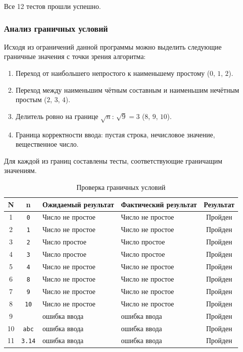 \documentclass{article}[14pt]
\begin{document}
Все 12 тестов прошли успешно.

\subsubsection{Анализ граничных условий}

Исходя из ограничений данной программы можно выделить следующие граничные значения с точки зрения алгоритма:

\begin{enumerate}
    \item Переход от наибольшего непростого к наименьшему простому ($0$, $1$, $2$).
    \item Переход между наименьшим чётным составным и наименьшим нечётным простым ($2$, $3$, $4$).
    \item Делитель ровно на границе $\sqrt{n}$: $\sqrt{9} = 3$ ($8$, $9$, $10$).
    \item Граница корректности ввода: пустая строка, нечисловое значение, вещественное число.
\end{enumerate}

Для каждой из границ составлены тесты, соответствующие граничащим значениям.

\begin{table}[H]
\centering
\caption{Проверка граничных условий}
\begin{tabular}{|c|c|p{3.5cm}|p{3.5cm}|c|}
\hline
\textbf{N} & \textbf{n} & \textbf{Ожидаемый результат} & \textbf{Фактический результат} & \textbf{Результат} \\
\hline
1 & \texttt{0}   & Число не простое & Число не простое & Пройден \\
\hline
2 & \texttt{1}   & Число не простое & Число не простое & Пройден \\
\hline
3 & \texttt{2}   & Число простое    & Число простое    & Пройден \\
\hline
4 & \texttt{3}   & Число простое    & Число простое    & Пройден \\
\hline
5 & \texttt{4}   & Число не простое & Число не простое & Пройден \\
\hline
6 & \texttt{8}   & Число не простое & Число не простое & Пройден \\
\hline
7 & \texttt{9}   & Число не простое & Число не простое & Пройден \\
\hline
8 & \texttt{10}  & Число не простое & Число не простое & Пройден \\
\hline
9 & \texttt{\ }  & ошибка ввода     & ошибка ввода     & Пройден \\
\hline
10 & \texttt{abc} & ошибка ввода    & ошибка ввода     & Пройден \\
\hline
11 & \texttt{3.14} & ошибка ввода   & ошибка ввода     & Пройден \\
\hline
\end{tabular}
\end{table}
\end{document}
